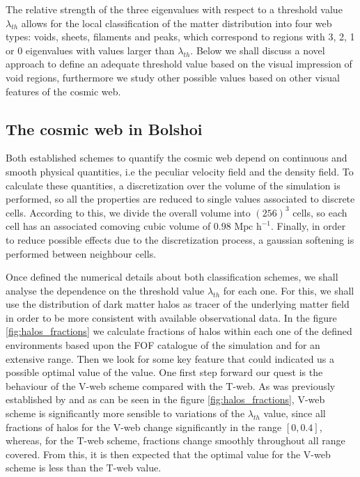 \documentclass[a4,useAMS,usenatbib,usegraphicx]{latex/mn2e}
\begin{document}
The relative strength of the three eigenvalues with respect to a threshold
value $\lambda_{th}$ allows for the local classification of the matter 
distribution into four web types: voids, sheets, filaments and peaks, 
which correspond to regions with 3, 2, 1 or 0 eigenvalues with values 
larger than $\lambda_{th}$. Below we shall discuss a novel approach to 
define an adequate threshold value based on the visual impression of void
regions, furthermore we study other possible values based on other visual
features of the cosmic web.



\subsection{The cosmic web in Bolshoi}
\label{subsec:web_in_simulations}



Both established schemes to quantify the cosmic web depend on continuous 
and smooth physical quantities, i.e the peculiar velocity field and the 
density field. To calculate these quantities, a discretization over the 
volume of the simulation is performed, so all the properties are reduced 
to single values associated to discrete cells. According to this, we 
divide the overall volume into $(256)^3$ cells, so each cell has an 
associated comoving cubic volume of $0.98 \mbox{ Mpc h}^{-1}$. Finally, in 
order to reduce possible effects due to the discretization process, a 
gaussian softening is performed between neighbour cells.



Once defined the numerical details about both classification schemes, we
shall analyse the dependence on the threshold value $\lambda_{th}$ for 
each one. For this, we shall use the distribution of dark matter halos as 
tracer of the underlying matter field in order to be more consistent with
available observational data. In the figure \ref{fig:halos_fractions} we 
calculate fractions of halos within each one of the defined environments 
based upon the FOF catalogue of the simulation and for an extensive \lth 
range. Then we look for some key feature that could indicated us a 
possible optimal value of the \lth value. One first step forward our quest 
is the behaviour of the V-web scheme compared with the T-web. As was 
previously established by  and as can be seen 
in the figure \ref{fig:halos_fractions}, V-web scheme is significantly more
sensible to variations of the $\lambda_{th}$ value, since all fractions of
halos for the V-web change significantly in the range $[0,0.4]$, whereas, 
for the T-web scheme, fractions change smoothly throughout all \lth range 
covered. From this, it is then expected that the optimal \lth value for 
the V-web scheme is less than the T-web value.
\end{document}
